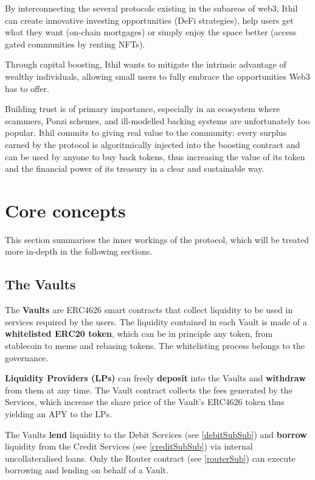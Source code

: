 \documentclass[a4paper,10 pt]{article}
\theoremstyle{definition}
\begin{document}
By interconnecting the several protocols existing in the subareas of web3, Ithil can create innovative investing opportunities (DeFi strategies), help users get what they want (on-chain mortgages) or simply enjoy the space better (access gated communities by renting NFTs).

Through capital boosting, Ithil wants to mitigate the intrinsic advantage of wealthy individuals, allowing small users to fully embrace the opportunities Web3 has to offer.

Building trust is of primary importance, especially in an ecosystem where scammers, Ponzi schemes, and ill-modelled backing systems are unfortunately too popular. Ithil commits to giving real value to the community: every surplus earned by the protocol is algoritmically injected into the boosting contract and can be used by anyone to buy back tokens, thus increasing the value of its token and the financial power of its treasury in a clear and sustainable way.

\newpage

\section{Core concepts}
This section summarises the inner workings of the protocol, which will be treated more in-depth in the following sections. 
\subsection{The Vaults}\label{vaultSub}
The {\bf Vaults} are ERC4626 smart contracts that collect liquidity to be used in services required by the users. The liquidity contained in each Vault is made of a {\bf whitelisted ERC20 token}, which can be in principle any token, from stablecoin to meme and rebasing tokens. The whitelisting process belongs to the governance.

{\bf Liquidity Providers (LPs)} can freely {\bf deposit} into the Vaults and {\bf withdraw} from them at any time. The Vault contract collects the fees generated by the Services, which increase the share price of the Vault's ERC4626 token thus yielding an APY to the LPs.

The Vaults {\bf lend} liquidity to the Debit Services (see \ref{debitSubSub}) and {\bf borrow} liquidity from the Credit Services (see \ref{creditSubSub}) via internal uncollateralised loans. Only the Router contract (see \ref{routerSub}) can execute borrowing and lending on behalf of a Vault.
\end{document}
